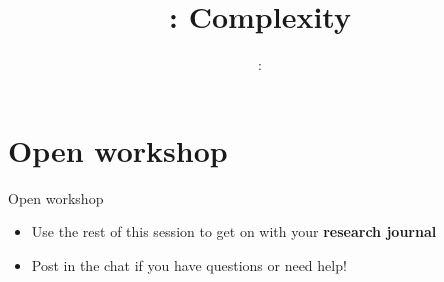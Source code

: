 \usepackage{../../beamerthemeFalmouthGamesAcademy}
\usepackage{multimedia}
\graphicspath{ {../../} }

\lstset{language=[Sharp]C
}

\usepackage[normalem]{ulem}
\usepackage{wasysym}

\usepackage{algpseudocode}

\usepackage{pdfpages}

\usetikzlibrary{arrows,automata}




\hypersetup{
pdftex,
pdftitle=\sessionnumber: Complexity,
pdfauthor=Ed Powley,
pdfdisplaydoctitle,
pdflang=en-GB
}
 

\title{\sessionnumber: Complexity}
\subtitle{\modulecode: \moduletitle}

\frame{\titlepage} 











% 

\part{Open workshop}
\frame{\partpage}

\begin{frame}{Open workshop}
    \begin{itemize}
        \item Use the rest of this session to get on with your \textbf{research journal}
        \item Post in the chat if you have questions or need help!
    \end{itemize}
\end{frame}



